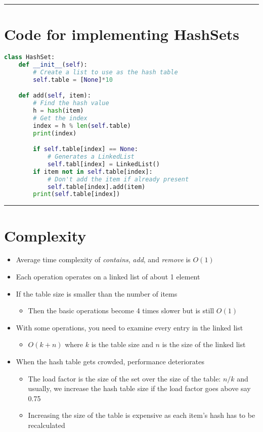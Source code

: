 \documentclass{article}
\begin{document}
\begin{center}
  \rule{0.5\textwidth}{0.4pt}
\end{center}

\section{Code for implementing HashSets}
\begin{lstlisting}[language=Python, frame=single]
class HashSet:
    def __init__(self):
        # Create a list to use as the hash table
        self.table = [None]*10

    def add(self, item):
        # Find the hash value
        h = hash(item)
        # Get the index
        index = h % len(self.table)
        print(index)

        if self.table[index] == None:
            # Generates a LinkedList
            self.tabl[index] = LinkedList()
        if item not in self.table[index]:
            # Don't add the item if already present
            self.table[index].add(item)
        print(self.table[index])
\end{lstlisting}

\begin{center}
  \rule{0.5\textwidth}{0.4pt}
\end{center}

\section{Complexity}
\begin{itemize}
  \item{Average time complexity of \textit{contains}, \textit{add}, and \textit{remove} is $O(1)$}
  \item{Each operation operates on a linked list of about 1 element}
  \item{If the table size is smaller than the number of items}
  \begin{itemize}
    \item{Then the basic operations become 4 times slower but is still $O(1)$}
  \end{itemize}
  \item{With some operations, you need to examine every entry in the linked list}
  \begin{itemize}
    \item{$O(k+n)$ where $k$ is the table size and $n$ is the size of the linked list}
  \end{itemize}
  \item{When the hash table gets crowded, performance deteriorates}
  \begin{itemize}
    \item{The load factor is the size of the set over the size of the table: $n/k$ and usually, we increase the hash table size if the load factor goes above say 0.75}
    \item{Increasing the size of the table is expensive as each item's hash has to be recalculated}
  \end{itemize}
\end{itemize}
\end{document}
